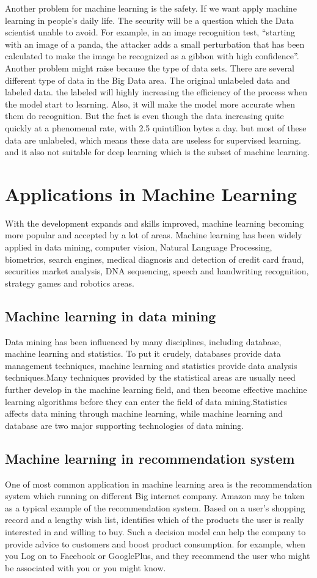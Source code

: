 \documentclass[sigconf]{acmart}
\begin{document}
Another problem for machine learning is the safety. If we want apply machine learning in people’s daily life. The security will be a question which the Data scientist unable to avoid. For example, in an image recognition test, ``starting with an image of a panda, the attacker adds a small perturbation that has been calculated to make the image be recognized as a gibbon with high confidence''\cite{Ophir}.
Another problem might raise because the type of data sets. There are several different type of data in the Big Data area. The original unlabeled data and labeled data. the labeled will highly increasing the efficiency of the process when the model start to learning. Also, it will make the model more accurate when them do recognition. But the fact is even though the data increasing quite quickly at a phenomenal rate, with 2.5 quintillion bytes a day. but most of these data are unlabeled, which means these data are useless for supervised learning. and it also not suitable for deep learning which is the subset of machine learning.
\section{Applications in Machine Learning}
With the development expands and skills improved, machine learning becoming more popular and accepted by a lot of areas. Machine learning has been widely applied in data mining, computer vision, Natural Language Processing, biometrics, search engines, medical diagnosis and detection of credit card fraud, securities market analysis, DNA sequencing, speech and handwriting recognition, strategy games and robotics areas.
\subsection{Machine learning in data mining}
Data mining has been influenced by many disciplines, including database, machine learning and statistics. To put it crudely, databases provide data management techniques, machine learning and statistics provide data analysis techniques.Many techniques provided by the statistical areas are usually need further develop in the machine learning field, and then become effective machine learning algorithms before they can enter the field of data mining\cite{Margaret01}.Statistics affects data mining through machine learning, while machine learning and database are two major supporting technologies of data mining.
\subsection{Machine learning in recommendation system}
One of most common application in machine learning area is the recommendation system which running on different Big internet company. Amazon may be taken as a typical example of the recommendation system. Based on a user's shopping record and a lengthy wish list, identifies which of the products the user is really interested in and willing to buy. Such a decision model can help the company to provide advice to customers and boost product consumption. for example, when you Log on to Facebook or GooglePlus, and they recommend the user who might be associated with you or you might know\cite{Bernard01}.
\end{document}
